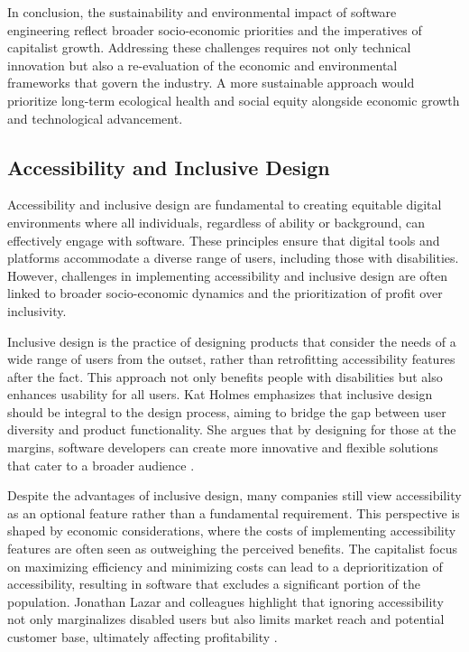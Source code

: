 \begin{refsection}
In conclusion, the sustainability and environmental impact of software engineering reflect broader socio-economic priorities and the imperatives of capitalist growth. Addressing these challenges requires not only technical innovation but also a re-evaluation of the economic and environmental frameworks that govern the industry. A more sustainable approach would prioritize long-term ecological health and social equity alongside economic growth and technological advancement.

\subsection{Accessibility and Inclusive Design}

Accessibility and inclusive design are fundamental to creating equitable digital environments where all individuals, regardless of ability or background, can effectively engage with software. These principles ensure that digital tools and platforms accommodate a diverse range of users, including those with disabilities. However, challenges in implementing accessibility and inclusive design are often linked to broader socio-economic dynamics and the prioritization of profit over inclusivity.

Inclusive design is the practice of designing products that consider the needs of a wide range of users from the outset, rather than retrofitting accessibility features after the fact. This approach not only benefits people with disabilities but also enhances usability for all users. Kat Holmes emphasizes that inclusive design should be integral to the design process, aiming to bridge the gap between user diversity and product functionality. She argues that by designing for those at the margins, software developers can create more innovative and flexible solutions that cater to a broader audience \cite[pp.~15-18]{holmes2020mismatch}.

Despite the advantages of inclusive design, many companies still view accessibility as an optional feature rather than a fundamental requirement. This perspective is shaped by economic considerations, where the costs of implementing accessibility features are often seen as outweighing the perceived benefits. The capitalist focus on maximizing efficiency and minimizing costs can lead to a deprioritization of accessibility, resulting in software that excludes a significant portion of the population. Jonathan Lazar and colleagues highlight that ignoring accessibility not only marginalizes disabled users but also limits market reach and potential customer base, ultimately affecting profitability \cite[pp.~32-35]{lazar2015inclusive}.


\end{refsection}
